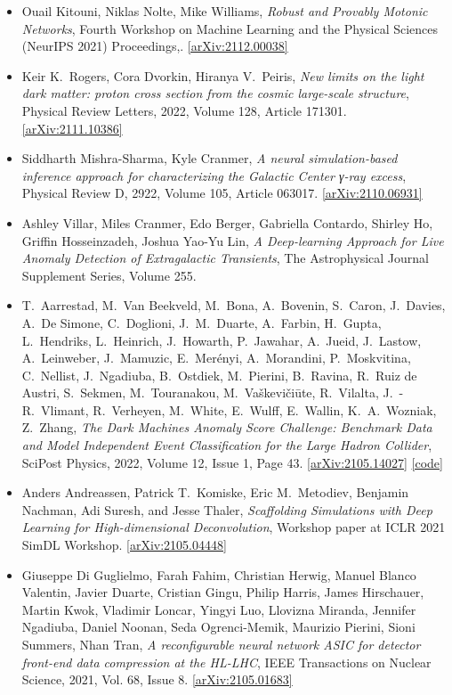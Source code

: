 \begin{itemize}
\item Ouail Kitouni, Niklas Nolte, Mike Williams, \textit{Robust and Provably Motonic Networks}, Fourth Workshop on Machine Learning and the Physical Sciences (NeurIPS 2021) Proceedings,. \href{https://arxiv.org/abs/2112.00038}{[arXiv:2112.00038]} 
\item Keir K.\  Rogers, Cora Dvorkin, Hiranya V.\  Peiris, \textit{New limits on the light dark matter: proton cross section from the cosmic large-scale structure}, Physical Review Letters, 2022, Volume 128, Article 171301. \href{https://arxiv.org/abs/2111.10386}{[arXiv:2111.10386]} 
\item Siddharth Mishra-Sharma, Kyle Cranmer, \textit{A neural simulation-based inference approach for characterizing the Galactic Center γ-ray excess}, Physical Review D, 2922, Volume 105, Article 063017. \href{https://arxiv.org/abs/2110.06931}{[arXiv:2110.06931]} 
\item Ashley Villar, Miles Cranmer, Edo Berger, Gabriella Contardo, Shirley Ho, Griffin Hosseinzadeh, Joshua Yao-Yu Lin, \textit{A Deep-learning Approach for Live Anomaly Detection of Extragalactic Transients}, The Astrophysical Journal Supplement Series, Volume 255. 
\item T.\  Aarrestad, M.\  Van Beekveld, M.\  Bona, A.\  Bovenin, S.\  Caron, J.\  Davies, A.\  De Simone, C.\  Doglioni, J.\ M.\  Duarte, A.\  Farbin, H.\  Gupta, L.\  Hendriks, L.\  Heinrich, J.\  Howarth, P.\  Jawahar, A.\  Jueid, J.\  Lastow, A.\  Leinweber, J.\  Mamuzic, E.\  Merényi, A.\  Morandini, P.\  Moskvitina, C.\  Nellist, J.\  Ngadiuba, B.\  Ostdiek, M.\  Pierini, B.\  Ravina, R.\  Ruiz de Austri, S.\  Sekmen, M.\  Touranakou, M.\  Vaškevičiūte, R.\  Vilalta, J.\ -R.\  Vlimant, R.\  Verheyen, M.\  White, E.\  Wulff, E.\  Wallin, K.\ A.\  Wozniak, Z.\  Zhang, \textit{The Dark Machines Anomaly Score Challenge: Benchmark Data and Model Independent Event Classification for the Large Hadron Collider}, SciPost Physics, 2022, Volume 12, Issue 1, Page 43. \href{https://arxiv.org/abs/2105.14027}{[arXiv:2105.14027]}  \href{https://github.com/bostdiek/DarkMachines-UnsupervisedChallenge}{[code]} 
\item Anders Andreassen, Patrick T.\  Komiske, Eric M.\  Metodiev, Benjamin Nachman, Adi Suresh, and Jesse Thaler, \textit{Scaffolding Simulations with Deep Learning for High-dimensional Deconvolution}, Workshop paper at ICLR 2021 SimDL Workshop. \href{https://arxiv.org/abs/2105.04448}{[arXiv:2105.04448]} 
\item Giuseppe Di Guglielmo, Farah Fahim, Christian Herwig, Manuel Blanco Valentin, Javier Duarte, Cristian Gingu, Philip Harris, James Hirschauer, Martin Kwok, Vladimir Loncar, Yingyi Luo, Llovizna Miranda, Jennifer Ngadiuba, Daniel Noonan, Seda Ogrenci-Memik, Maurizio Pierini, Sioni Summers, Nhan Tran, \textit{A reconfigurable neural network ASIC for detector front-end data compression at the HL-LHC}, IEEE Transactions on Nuclear Science, 2021, Vol. 68, Issue 8. \href{https://arxiv.org/abs/2105.01683}{[arXiv:2105.01683]} 

\end{itemize}
